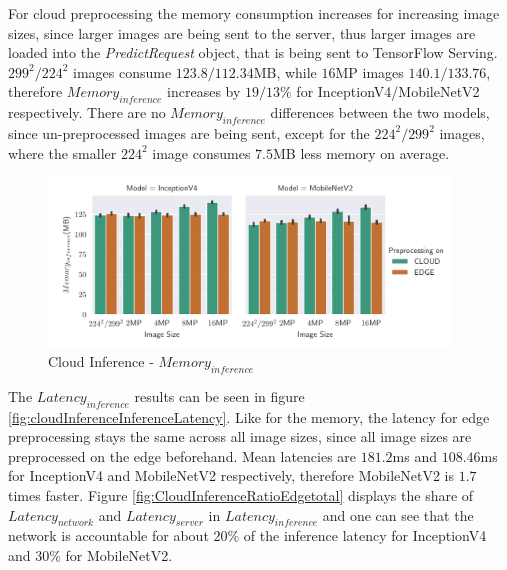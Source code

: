 For cloud preprocessing the memory consumption increases for increasing image sizes, since larger images are being sent to the server, thus larger images are loaded into the \emph{PredictRequest} object, that is being sent to TensorFlow Serving.
$299^2/224^2$ images consume $123.8/112.34$MB, while $16$MP images $140.1/133.76$, therefore $Memory_{inference}$ increases by $19/13\%$ for InceptionV4/MobileNetV2 respectively.
There are no $Memory_{inference}$  differences between the two models, since un-preprocessed images are being sent, except for the $224^2/299^2$ images, where the smaller $224^2$ image consumes $7.5$MB less memory on average.
\begin{figure}[!htb]
\centering
\includegraphics[width=0.95\textwidth]{./Bilder/single_plots/cloud_inference_plots/Cloud_Inference_Memory.pdf}
\caption{Cloud Inference -  $Memory_{inference}$}
\label{fig:cloudInferenceInferenceMemory}
\end{figure}
The $Latency_{inference}$ results can be seen in figure \ref{fig:cloudInferenceInferenceLatency}.
Like for the memory, the latency for edge preprocessing stays the same across all image sizes, since all image sizes are preprocessed on the edge beforehand. 
Mean latencies are $181.2$ms and $108.46$ms for InceptionV4 and MobileNetV2 respectively, therefore MobileNetV2 is $1.7$ times faster.
Figure \ref{fig:CloudInferenceRatioEdgetotal} displays the share of $Latency_{network}$ and $Latency_{server}$ in $Latency_{inference}$ and one can see that the network is accountable for about $20\%$ of the  inference latency for InceptionV4 and $30\%$ for MobileNetV2.

